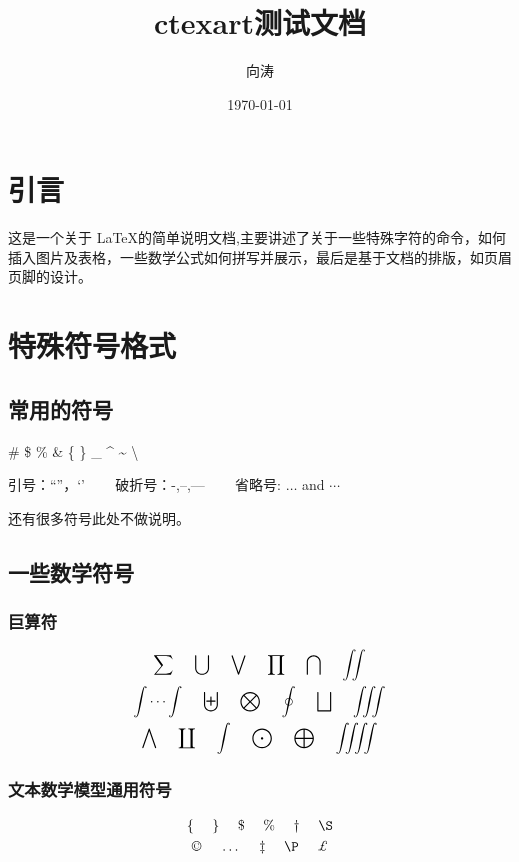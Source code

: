 \documentclass{ctexart}
\title{ctexart测试文档}
\author{向涛}
\date{\today}
\begin{document}
\maketitle   %

\section{引言}
这是一个关于 \LaTeX 的简单说明文档,主要讲述了关于一些特殊字符的命令，如何插入图片及表格，一些数学公式如何拼写并展示，最后是基于文档的排版，如页眉页脚的设计。

\section{特殊符号格式}
\subsection{常用的符号}
\# \$ \% \& \{ \} \_ \^{}  \~{} \textbackslash    %

引号：``''，`'  ~~~  破折号：-,--,---  ~~~  省略号: $ \dots $ and $ \cdots $

还有很多符号此处不做说明。

\subsection{一些数学符号}
\subsubsection{巨算符}
\begin{gather}
   \sum ~~~~ \bigcup ~~~~ \bigvee ~~~~ \prod ~~~~ \bigcap ~~~~ \iint \\
  \idotsint~~~~\biguplus ~~~~ \bigotimes ~~~~ \oint ~~~~ \bigsqcup~~~~\iiint \\
   \bigwedge ~~~~  \coprod ~~~~ \int ~~~~ \bigodot ~~~~ \bigoplus ~~~~\iiiint
\end{gather}

\subsubsection{文本数学模型通用符号}
\begin{gather}
  \{ ~~~~ \} ~~~~ \$ ~~~~ \% ~~~~ \dag ~~~~ \S \\
  \copyright~~~~\dots ~~~~ \ddag ~~~~ \P ~~~~ \pounds
\end{gather}
\end{document}
